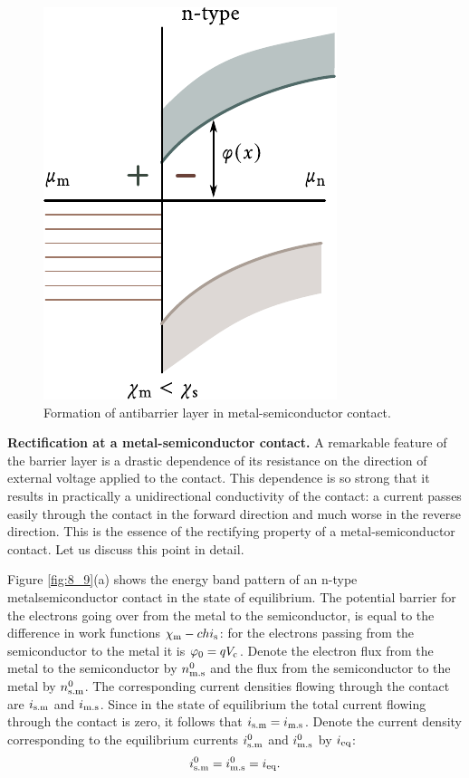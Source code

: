 \begin{figure}[t]
	\begin{center}
		\includegraphics[scale=1]{figures/ch_08/fig_8_8.pdf}
		\caption[]{Formation of antibarrier layer in metal-semiconductor contact.}
		\label{fig:8_8}
	\end{center}
	\vspace{-0.8cm}
\end{figure}

\textbf{Rectification at a metal-semiconductor contact.} A remarkable feature of the barrier layer is a drastic dependence of its resistance on the direction of external voltage applied to the contact. This dependence is so strong that it results in practically a unidirectional conductivity of the contact: a current passes easily through the contact in the forward direction and much worse in the reverse direction. This is the essence of the rectifying property of a metal-semiconductor contact.
Let us discuss this point in detail.

Figure \ref{fig:8_9}(a) shows the energy band pattern of an n-type metalsemiconductor contact in the state of equilibrium. The potential barrier for the electrons going over from the metal to the
semiconductor, is equal to the difference in work functions $\chi_{\text{m}}-chi_{\text{s}}$: for the electrons passing from the semiconductor to
the metal it is $\varphi_0=qV_{\text{c}}$. Denote the electron flux from the metal to the semiconductor by $n_{\text{m.s}}^0$ and the flux from the semiconductor
to the metal by $n_{\text{s.m}}^0$. The corresponding current densities flowing through the contact are
$i_{\text{s.m}}$ and $i_{\text{m.s}}$. Since in the state of equilibrium the total current flowing through the contact is zero, it follows that $i_{\text{s.m}}=i_{\text{m.s}}$. Denote the current density corresponding to the equilibrium currents $i_{\text{s.m}}^0$ and $i_{\text{m.s}}^0$ by $i_{\text{eq}}$:
\begin{equation}\label{eq:8_9}
    i_{\text{s.m}}^0 = i_{\text{m.s}}^0 = i_{\text{eq}}.
\end{equation}

